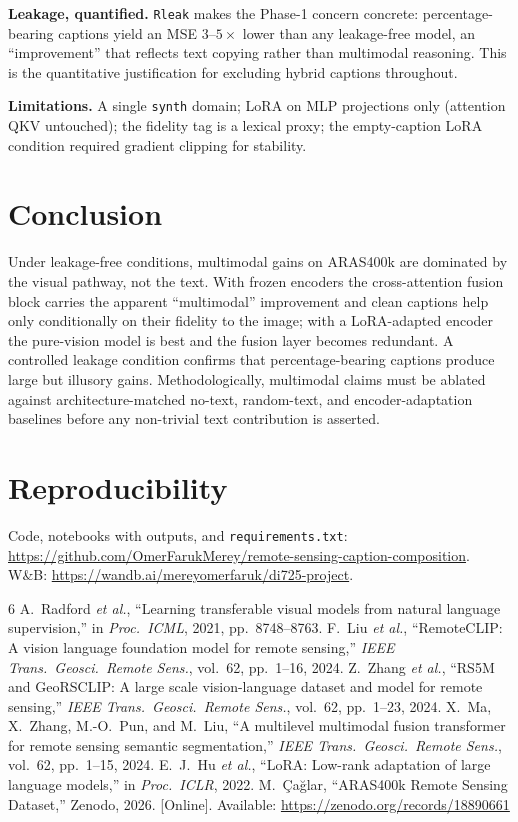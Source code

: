 \documentclass[conference]{IEEEtran}
\begin{document}
\textbf{Leakage, quantified.} \texttt{Rleak} makes the Phase-1 concern concrete:
percentage-bearing captions yield an MSE $3$--$5\times$ lower than any
leakage-free model, an ``improvement'' that reflects text copying rather than
multimodal reasoning. This is the quantitative justification for excluding
hybrid captions throughout.

\textbf{Limitations.} A single \texttt{synth} domain; LoRA on MLP projections
only (attention QKV untouched); the fidelity tag is a lexical proxy; the
empty-caption LoRA condition required gradient clipping for stability.

\section{Conclusion}

Under leakage-free conditions, multimodal gains on ARAS400k are dominated by
the visual pathway, not the text. With frozen encoders the cross-attention
fusion block carries the apparent ``multimodal'' improvement and clean captions
help only conditionally on their fidelity to the image; with a LoRA-adapted
encoder the pure-vision model is best and the fusion layer becomes redundant.
A controlled leakage condition confirms that percentage-bearing captions
produce large but illusory gains. Methodologically, multimodal claims must be
ablated against architecture-matched no-text, random-text, and
encoder-adaptation baselines before any non-trivial text contribution is
asserted.

\section*{Reproducibility}
Code, notebooks with outputs, and \texttt{requirements.txt}:
\url{https://github.com/OmerFarukMerey/remote-sensing-caption-composition}.
W\&B: \url{https://wandb.ai/mereyomerfaruk/di725-project}.

\begin{thebibliography}{6}
 A.~Radford \emph{et al.}, ``Learning transferable visual models
from natural language supervision,'' in \emph{Proc.\ ICML}, 2021,
pp.~8748--8763.
 F.~Liu \emph{et al.}, ``RemoteCLIP: A vision language
foundation model for remote sensing,'' \emph{IEEE Trans.\ Geosci.\ Remote
Sens.}, vol.~62, pp.~1--16, 2024.
 Z.~Zhang \emph{et al.}, ``RS5M and GeoRSCLIP: A large scale
vision-language dataset and model for remote sensing,'' \emph{IEEE Trans.\
Geosci.\ Remote Sens.}, vol.~62, pp.~1--23, 2024.
 X.~Ma, X.~Zhang, M.-O.~Pun, and M.~Liu, ``A multilevel
multimodal fusion transformer for remote sensing semantic segmentation,''
\emph{IEEE Trans.\ Geosci.\ Remote Sens.}, vol.~62, pp.~1--15, 2024.
\bibitem{lora} E.~J.~Hu \emph{et al.}, ``LoRA: Low-rank adaptation of large
language models,'' in \emph{Proc.\ ICLR}, 2022.
 M.~\c{C}a\u{g}lar, ``ARAS400k Remote Sensing Dataset,''
Zenodo, 2026. [Online]. Available: \url{https://zenodo.org/records/18890661}
\end{thebibliography}
\end{document}
